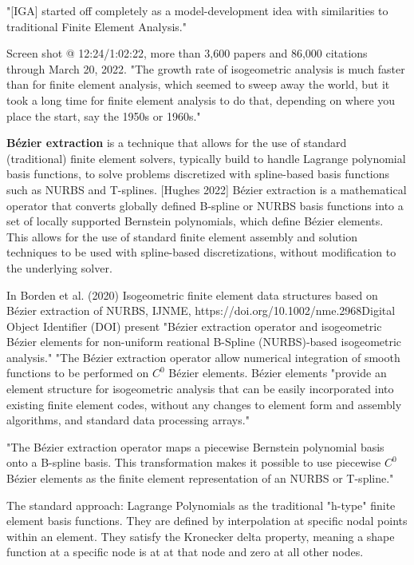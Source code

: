 \documentclass[12pt,report,justified]{SANDreport}
\begin{document}
"[IGA] started off completely as a model-development idea with similarities to traditional Finite Element Analysis."

Screen shot @ 12:24/1:02:22, more than 3,600 papers and 86,000 citations through March 20, 2022. "The growth rate of isogeometric analysis is much faster than for finite element analysis, which seemed to sweep away the world, but it took a long time for finite element analysis to do that, depending on where you place the start, say the 1950s or 1960s."

{\bf B{\'e}zier extraction} is a technique that allows for the use of standard (traditional) finite element solvers, typically build to handle Lagrange polynomial basis functions, to solve problems discretized with spline-based basis functions such as NURBS and T-splines. [Hughes 2022] B{\'e}zier extraction is a mathematical operator that converts globally defined B-spline or NURBS basis functions into a set of locally supported Bernstein polynomials, which define B{\'e}zier elements.  This allows for the use of standard finite element assembly and solution techniques to be used with spline-based discretizations, without modification to the underlying solver. 

In Borden et al. (2020) Isogeometric finite element data structures based on B{\'e}zier extraction of NURBS, IJNME, 
https://doi.org/10.1002/nme.2968Digital Object Identifier (DOI)
present "B{\'e}zier extraction operator and isogeometric B{\'e}zier elements for non-uniform reational B-Spline (NURBS)-based isogeometric analysis."  "The B{\'e}zier extraction operator allow numerical integration of smooth functions to be performed on $C^0$ B{\'e}zier elements. 
B{\'e}zier elements "provide an element structure for isogeometric analysis that can be easily incorporated into existing finite element codes, without any changes to element form and assembly algorithms, and standard data processing arrays."

"The B{\'e}zier extraction operator maps a piecewise Bernstein polynomial basis onto a B-spline basis.  This transformation makes it possible to use piecewise $C^0$ B{\'e}zier elements as the finite element representation of an NURBS or T-spline."

The standard approach: Lagrange Polynomials as the traditional "h-type" finite element basis functions.  They are defined by interpolation at specific nodal points within an element.  They satisfy the Kronecker delta property, meaning a shape function at a specific node is at at that node and zero at all other nodes.  
\end{document}
